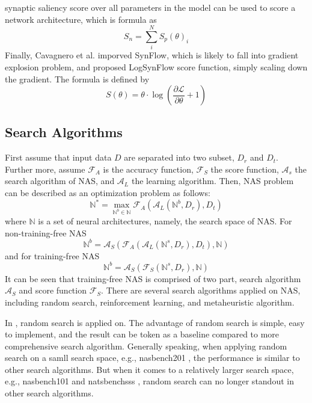 \documentclass[sigconf]{acmart}
\begin{document}
    synaptic saliency score over all parameters in the model can be used to score a network 
    architecture, which is formula as 
    \begin{equation}
        \label{equ:zero_cost}
        S_n=\sum^N_i S_p(\theta)_i
    \end{equation}
    Finally, Cavagnero et al. \cite{Cavagnero_2023} imporved SynFlow, which is likely to fall into 
    gradient explosion problem, and proposed LogSynFlow score function, simply scaling down the gradient. 
    The formula is defined by 
    \begin{equation}
        \label{equ:logsynflow}
        S(\theta)=\theta\cdot\log(\frac{\partial \mathcal L}{\partial \theta}+1)
    \end{equation}

    \subsection{Search Algorithms}
    First assume that input data $D$ are separated into two subset, $D_r$ and $D_t$. Further more, 
    assume $\mathcal F_A$ is the accuracy function, $\mathcal F_S$ the score function, $\mathcal A_s$ the 
    search algorithm of NAS, and $\mathcal A_L$ the learning algorithm. Then, NAS problem can be 
    described as an optimization problem as follows: 
    \begin{equation}
        \label{equ:nas}
        \mathbb N^*=\max_{\mathbb N^b\in\mathbb N}\mathcal F_A(\mathcal A_L(\mathbb N^b, D_r), D_t)
    \end{equation}
    where $\mathbb N$ is a set of neural architectures, namely, the search space of NAS. 
    For non-training-free NAS 
    \begin{equation}
        \label{equ:non-training_free_nas}
        \mathbb N^b=\mathcal A_S(\mathcal F_A(\mathcal A_L(\mathbb N^s, D_r), D_t), \mathbb N)
    \end{equation}
    and for training-free NAS 
    \begin{equation}
        \label{equ:training_free_nas}
        \mathbb N^b=\mathcal A_S(\mathcal F_S(\mathbb N^s, D_r), \mathbb N)
    \end{equation}
    It can be seen that training-free NAS is comprised of two part, search algorithm $\mathcal A_S$ and score 
    function $\mathcal F_S$. 
    There are several search algorithms applied on NAS, including random search, reinforcement learning, and
    metaheuristic algorithm. 
    
    In \cite{https://doi.org/10.48550/arxiv.2006.04647} \cite{Lopes_2021}, random search is applied on. 
    The advantage of random search is simple, easy to implement, and the result can be token as a 
    baseline compared to more comprehensive search algorithm. Generally speaking, when applying random 
    search on a samll search space, e.g., nasbench201 \cite{dong2020nasbench201}, the performance is 
    similar to other search algorithms. But when it comes to a relatively larger search space, e.g., nasbench101 
    \cite{ying2019nasbench101} and natsbenchsss \cite{Dong_2021}, random search can no longer standout 
    in other search algorithms. 
\end{document}
